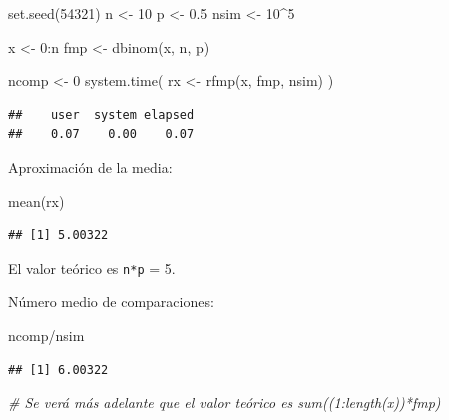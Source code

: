 \documentclass[
]{book}
\newenvironment{Shaded}{\begin{snugshade}}{\end{snugshade}}
\newcommand{\CommentTok}[1]{\textcolor[rgb]{0.56,0.35,0.01}{\textit{#1}}}
\newcommand{\DecValTok}[1]{\textcolor[rgb]{0.00,0.00,0.81}{#1}}
\newcommand{\FloatTok}[1]{\textcolor[rgb]{0.00,0.00,0.81}{#1}}
\newcommand{\FunctionTok}[1]{\textcolor[rgb]{0.00,0.00,0.00}{#1}}
\newcommand{\NormalTok}[1]{#1}
\newcommand{\OtherTok}[1]{\textcolor[rgb]{0.56,0.35,0.01}{#1}}
\newcommand{\SpecialCharTok}[1]{\textcolor[rgb]{0.00,0.00,0.00}{#1}}
\theoremstyle{break}
\theoremstyle{definition}
\theoremstyle{definition}
\theoremstyle{definition}
\theoremstyle{definition}
\theoremstyle{remark}
\begin{document}
\begin{Shaded}
\begin{Highlighting}[]
\FunctionTok{set.seed}\NormalTok{(}\DecValTok{54321}\NormalTok{)}
\NormalTok{n }\OtherTok{\textless{}{-}} \DecValTok{10}
\NormalTok{p }\OtherTok{\textless{}{-}} \FloatTok{0.5}
\NormalTok{nsim }\OtherTok{\textless{}{-}} \DecValTok{10}\SpecialCharTok{\^{}}\DecValTok{5}

\NormalTok{x }\OtherTok{\textless{}{-}} \DecValTok{0}\SpecialCharTok{:}\NormalTok{n}
\NormalTok{fmp }\OtherTok{\textless{}{-}} \FunctionTok{dbinom}\NormalTok{(x, n, p)}

\NormalTok{ncomp }\OtherTok{\textless{}{-}} \DecValTok{0}
\FunctionTok{system.time}\NormalTok{( rx }\OtherTok{\textless{}{-}} \FunctionTok{rfmp}\NormalTok{(x, fmp, nsim) )}
\end{Highlighting}
\end{Shaded}

\begin{verbatim}
##    user  system elapsed 
##    0.07    0.00    0.07
\end{verbatim}

Aproximación de la media:

\begin{Shaded}
\begin{Highlighting}[]
\FunctionTok{mean}\NormalTok{(rx)}
\end{Highlighting}
\end{Shaded}

\begin{verbatim}
## [1] 5.00322
\end{verbatim}

El valor teórico es \texttt{n*p} = 5.

Número medio de comparaciones:

\begin{Shaded}
\begin{Highlighting}[]
\NormalTok{ncomp}\SpecialCharTok{/}\NormalTok{nsim}
\end{Highlighting}
\end{Shaded}

\begin{verbatim}
## [1] 6.00322
\end{verbatim}

\begin{Shaded}
\begin{Highlighting}[]
\CommentTok{\# Se verá más adelante que el valor teórico es sum((1:length(x))*fmp)}
\end{Highlighting}
\end{Shaded}
\end{document}
